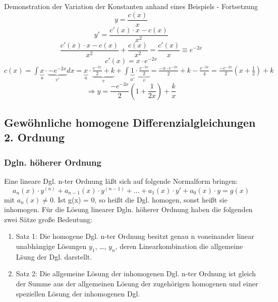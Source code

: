 \documentclass[
	11pt, %
]{beamer}
\begin{document}
\begin{frame}
	\begin{exampleblock}{Demonstration der Variation der Konstanten anhand eines Beispiels - Fortsetzung}
		\begin{equation}
			y = \frac{c(x)}{x}
		\end{equation}
		\begin{equation}
			y' = \frac{c'(x)\cdot x - c(x)}{x^2}
		\end{equation}
		\begin{equation}
			\frac{c'(x)\cdot x - c(x)}{x^2}+\frac{c(x)}{x^2}= \frac{c'(x)}{x}\equiv e^{-2x}
		\end{equation}
		\begin{equation}
			c'(x)=x\cdot e^{-2x}
		\end{equation}
			$c(x)=\int \underbrace{x}_{u}\cdot \underbrace{-e^{-2x}}_{v'}dx=\underbrace{x}_{u}\cdot\underbrace{\frac{e^{-2x}}{2}+k}_{v}+\int\underbrace{1}_{u'}\cdot\underbrace{\frac{e^{-2x}}{2}}_{v}=
			 \frac{-x\cdot e^{-2x}}{2}+k-\frac{e^{-2x}}{4}=\frac{-e^{-2x}}{2}(x+\frac{1}{2})+k$
		\begin{equation}
			\Rightarrow y=\frac{-e^{-2x}}{2}(1+\frac{1}{2x})+\frac{k}{x}
		\end{equation}
	\end{exampleblock}

\end{frame}
\subsection{Gew\"ohnliche homogene Differenzialgleichungen 2. Ordnung}
\begin{frame}
	\frametitle{Dgln. h\"oherer Ordnung}
	Eine lineare Dgl. n-ter Ordnung läßt sich auf folgende Normalform bringen:
	\begin{equation}
		a_n(x)\cdot y^{(n)} + a_{n-1}(x)\cdot y^{(n-1)} + \ldots + a_1(x)\cdot y' + a_0(x)\cdot y = g(x) \label{normalform}
	\end{equation}
	mit $a_n(x) \neq  0$. Ist g(x) = 0, so heißt die Dgl. homogen, sonst heißt sie inhomogen. Für die L\"osung linearer Dgln. h\"oherer Ordnung haben die folgenden zwei S\"atze große Bedeutung: 
	\begin{enumerate}
		\item Satz 1: Die homogene Dgl. n-ter Ordnung besitzt genau n voneinander linear unabh\"angige Lösungen $y_1$, \ldots , $y_n$, deren Linearkombination die allgemeine L\"sung der Dgl. darstellt. 
			\item Satz 2: Die allgemeine L\"osung der inhomogenen Dgl. n-ter Ordnung ist gleich der Summe aus der allgemeinen L\"osung der zugeh\"origen homogenen und einer speziellen L\"osung der inhomogenen Dgl.
	\end{enumerate}
\end{frame}
\end{document}
